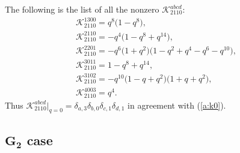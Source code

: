 \begin{example}\label{ex:K}
The following is the list of all the nonzero $\mathscr{K}^{abcd}_{2110}$:
\begin{gather*}
\mathscr{K}^{1300}_{2110}=q^8 \big(1 - q^8\big),\\
\mathscr{K}^{2110}_{2110} =-q^4 \big(1 - q^8 + q^{14}\big),\\
\mathscr{K}^{2201}_{2110} =-q^6 \big(1 + q^2\big) \big(1 - q^2 + q^4 - q^6 - q^{10}\big),\\
\mathscr{K}^{3011}_{2110} =1 - q^8 + q^{14},\\
\mathscr{K}^{3102}_{2110} =-q^{10} \big(1 - q + q^2\big) \big(1 + q + q^2\big),\\
\mathscr{K}^{4003}_{2110}=q^4.
\end{gather*}
Thus $\mathscr{K}^{abcd}_{2110}|_{q=0}
= \delta_{a,3}\delta_{b,0}\delta_{c,1}\delta_{d,1}$ in agreement with
(\ref{a:k0}).
\end{example}

\subsection[$G_2$ case]{$\boldsymbol{G_2}$ case}\label{a:ss:g2}

